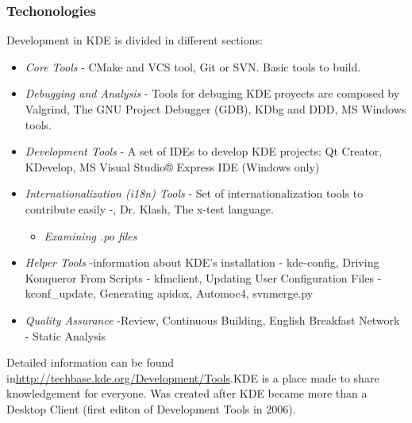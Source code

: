 \subsubsection{ Techonologies} Development in KDE is divided in different sections:
\begin{itemize}
	\item \textit{Core Tools} - CMake and VCS tool, Git or SVN. Basic tools to build.
	\item \textit{Debugging and Analysis} - Tools for debuging KDE proyects are composed by Valgrind, The GNU Project Debugger (GDB), KDbg and DDD, MS Windows tools.
	\item \textit{Development Tools} - A set of IDEs to develop KDE projects: Qt Creator, KDevelop, MS Visual Studio® Express IDE (Windows only)
	\item \textit{Internationalization (i18n) Tools} - Set of internationalization tools to contribute easily -\nolinebreakLokalize, Dr. Klash, The x-test language.
\begin{itemize}
	\item \textit{Examining .po files}
\end{itemize}
	\item \textit{Helper Tools} -\nolinebreakGet information about KDE's installation - kde-config, Driving Konqueror From Scripts - kfmclient, Updating User Configuration Files - kconf\_update, Generating apidox, Automoc4, svnmerge.py
	\item \textit{Quality Assurance} -\nolinebreakCode Review, Continuous Building, English Breakfast Network - Static Analysis
\end{itemize} Detailed information can be found in\nolinebreak\href{http://techbase.kde.org/Development/Tools}{http://techbase.kde.org/Development/Tools}.\nolinebreakTechBase KDE is a place made to share knowledgement for everyone. Was created after KDE became more than a Desktop Client (first editon of Development Tools in 2006).

